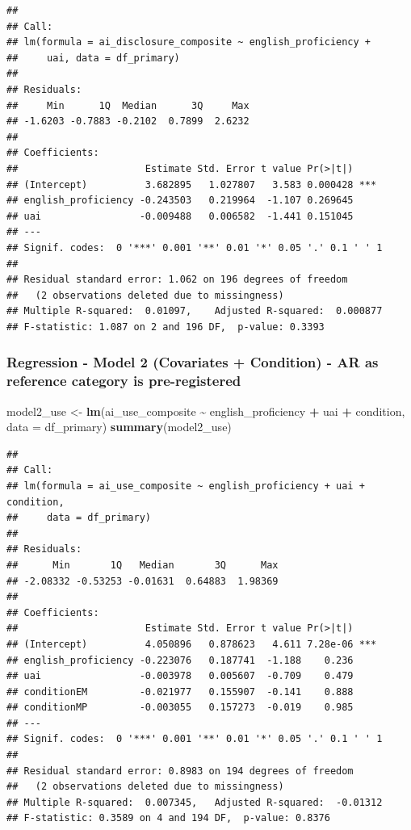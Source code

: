 \documentclass[
]{article}
\newenvironment{Shaded}{\begin{snugshade}}{\end{snugshade}}
\newcommand{\AttributeTok}[1]{\textcolor[rgb]{0.13,0.29,0.53}{#1}}
\newcommand{\FunctionTok}[1]{\textcolor[rgb]{0.13,0.29,0.53}{\textbf{#1}}}
\newcommand{\NormalTok}[1]{#1}
\newcommand{\OtherTok}[1]{\textcolor[rgb]{0.56,0.35,0.01}{#1}}
\newcommand{\SpecialCharTok}[1]{\textcolor[rgb]{0.81,0.36,0.00}{\textbf{#1}}}
\begin{document}
\begin{verbatim}
## 
## Call:
## lm(formula = ai_disclosure_composite ~ english_proficiency + 
##     uai, data = df_primary)
## 
## Residuals:
##     Min      1Q  Median      3Q     Max 
## -1.6203 -0.7883 -0.2102  0.7899  2.6232 
## 
## Coefficients:
##                      Estimate Std. Error t value Pr(>|t|)    
## (Intercept)          3.682895   1.027807   3.583 0.000428 ***
## english_proficiency -0.243503   0.219964  -1.107 0.269645    
## uai                 -0.009488   0.006582  -1.441 0.151045    
## ---
## Signif. codes:  0 '***' 0.001 '**' 0.01 '*' 0.05 '.' 0.1 ' ' 1
## 
## Residual standard error: 1.062 on 196 degrees of freedom
##   (2 observations deleted due to missingness)
## Multiple R-squared:  0.01097,    Adjusted R-squared:  0.000877 
## F-statistic: 1.087 on 2 and 196 DF,  p-value: 0.3393
\end{verbatim}

\subsubsection{Regression - Model 2 (Covariates + Condition) - AR as
reference category is
pre-registered}\label{regression---model-2-covariates-condition---ar-as-reference-category-is-pre-registered}

\begin{Shaded}
\begin{Highlighting}[]
\NormalTok{model2\_use }\OtherTok{\textless{}{-}} \FunctionTok{lm}\NormalTok{(ai\_use\_composite }\SpecialCharTok{\textasciitilde{}}\NormalTok{ english\_proficiency }\SpecialCharTok{+}\NormalTok{ uai }\SpecialCharTok{+}\NormalTok{ condition, }\AttributeTok{data =}\NormalTok{ df\_primary)}
\FunctionTok{summary}\NormalTok{(model2\_use)}
\end{Highlighting}
\end{Shaded}

\begin{verbatim}
## 
## Call:
## lm(formula = ai_use_composite ~ english_proficiency + uai + condition, 
##     data = df_primary)
## 
## Residuals:
##      Min       1Q   Median       3Q      Max 
## -2.08332 -0.53253 -0.01631  0.64883  1.98369 
## 
## Coefficients:
##                      Estimate Std. Error t value Pr(>|t|)    
## (Intercept)          4.050896   0.878623   4.611 7.28e-06 ***
## english_proficiency -0.223076   0.187741  -1.188    0.236    
## uai                 -0.003978   0.005607  -0.709    0.479    
## conditionEM         -0.021977   0.155907  -0.141    0.888    
## conditionMP         -0.003055   0.157273  -0.019    0.985    
## ---
## Signif. codes:  0 '***' 0.001 '**' 0.01 '*' 0.05 '.' 0.1 ' ' 1
## 
## Residual standard error: 0.8983 on 194 degrees of freedom
##   (2 observations deleted due to missingness)
## Multiple R-squared:  0.007345,   Adjusted R-squared:  -0.01312 
## F-statistic: 0.3589 on 4 and 194 DF,  p-value: 0.8376
\end{verbatim}
\end{document}
